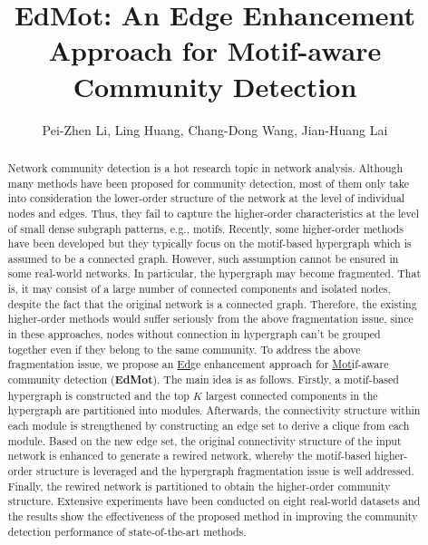 \documentclass[sigconf]{acmart}
\begin{document}

\title{EdMot: An Edge Enhancement Approach for Motif-aware Community Detection}

\author{Pei-Zhen Li, Ling Huang, Chang-Dong Wang, Jian-Huang Lai}






\begin{abstract}
Network community detection is a hot research topic in network analysis. Although many methods have been proposed for community detection, most of them only take into consideration the lower-order structure of the network at the level of individual nodes and edges. Thus, they fail to capture the higher-order characteristics at the level of small dense subgraph patterns, e.g., motifs. Recently, some higher-order methods have been developed but they typically focus on the motif-based hypergraph which is assumed to be a connected graph. However, such assumption cannot be ensured in some real-world networks. In particular, the hypergraph may become fragmented. That is, it may consist of a large number of connected components and isolated nodes, despite the fact that the original network is a connected graph.
Therefore, the existing higher-order methods would suffer seriously from the above fragmentation issue, since in these approaches, nodes without connection in hypergraph can't be grouped together even if they belong to the same community. To address the above fragmentation issue, we propose an \underline{Ed}ge enhancement approach for \underline{Mot}if-aware community detection (\textbf{EdMot}). The main idea is as follows. Firstly, a motif-based hypergraph is constructed and the top $K$ largest connected components in the hypergraph are partitioned into modules. Afterwards, the connectivity structure within each module is strengthened by constructing an edge set to derive a clique from each module. Based on the new edge set, the original connectivity structure of the input network is enhanced to generate a rewired network, whereby the motif-based higher-order structure is leveraged and the hypergraph fragmentation issue is well addressed. Finally, the rewired network is partitioned to obtain the higher-order community structure.
Extensive experiments have been conducted on eight real-world datasets and the results show the effectiveness of the proposed method in improving the community detection performance of state-of-the-art methods.
\end{abstract}
\end{document}
